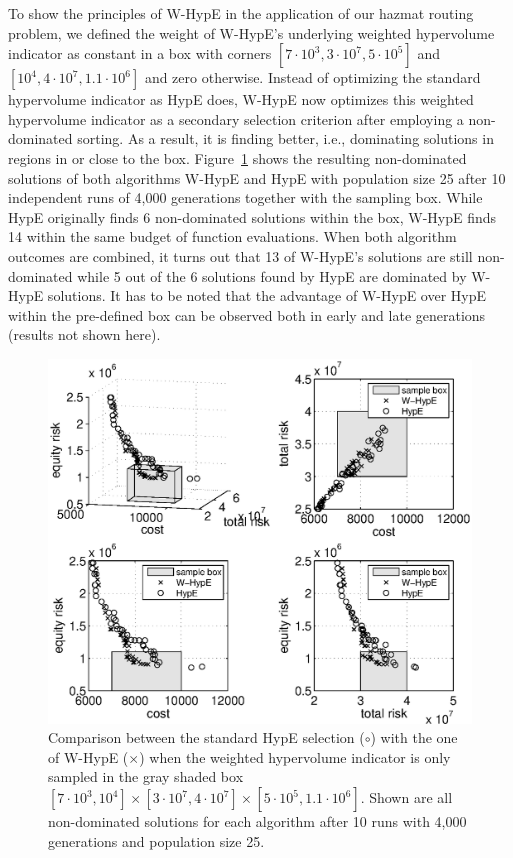 \documentclass[preprint,12pt]{elsarticle}
\begin{document}
To show the principles of W-HypE in the application of our hazmat routing problem, we defined the weight of W-HypE's underlying weighted hypervolume indicator as constant in a box with corners $[7\cdot 10^3, 3\cdot 10^7, 5\cdot 10^5]$ and $[10^4, 4\cdot 10^7, 1.1\cdot 10^6]$ and zero otherwise. Instead of optimizing the standard hypervolume indicator as HypE does, W-HypE now optimizes this weighted hypervolume indicator as a secondary selection criterion after employing a non-dominated sorting. As a result, it is finding better, i.e., dominating solutions in regions in or close to the box. Figure~\ref{fig:whype} shows the resulting non-dominated solutions of both algorithms W-HypE and HypE with population size 25 after 10 independent runs of 4,000 generations together with the sampling box. While HypE originally finds 6 non-dominated solutions within the box, W-HypE finds 14 within the same budget of function evaluations. When both algorithm outcomes are combined, it turns out that 13 of W-HypE's solutions are still non-dominated while 5 out of the 6 solutions found by HypE are dominated by W-HypE solutions. It has to be noted that the advantage of W-HypE over HypE within the pre-defined box can be observed both in early and late generations (results not shown here).


\begin{figure}
	\centering
	\includegraphics[width=0.75\columnwidth]{../experiments/randVsCost/WHypEVsHypE_ns4_1_OriginalCosts2.eps}
	\vspace{-1em}
	\caption{\label{fig:whype} Comparison between the standard HypE selection ($\circ$) with the one of W-HypE ($\times$) when the weighted hypervolume indicator is only sampled in the gray shaded box $[7\cdot 10^3, 10^4]\times[3\cdot 10^7, 4\cdot 10^7]\times[5\cdot 10^5, 1.1\cdot 10^6]$. Shown are all non-dominated solutions for each algorithm after 10 runs with 4,000 generations and population size 25.}
\end{figure}
\end{document}
